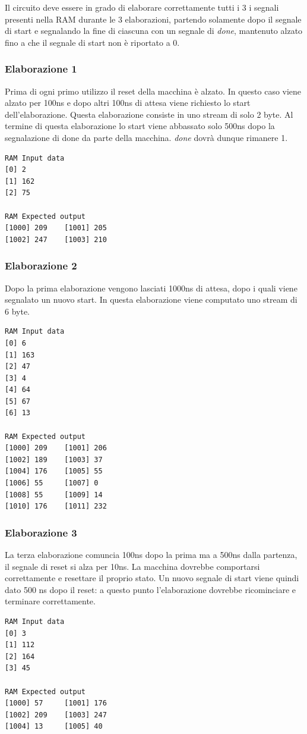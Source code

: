 \documentclass[a4paper]{report}
\begin{document}
Il circuito deve essere in grado di elaborare correttamente tutti i 3 i segnali presenti nella RAM durante le 3 elaborazioni, partendo solamente dopo il segnale di start e segnalando la fine di ciascuna con un segnale di \textit{done}, mantenuto alzato fino a che il segnale di start non è riportato a 0.

\subsubsection{Elaborazione 1}
Prima di ogni primo utilizzo il reset della macchina è alzato. In questo caso viene alzato per 100ns e dopo altri 100ns di attesa viene richiesto lo start dell'elaborazione. Questa elaborazione consiste in uno stream di solo 2 byte. Al termine di questa elaborazione lo start viene abbassato solo 500ns dopo la segnalazione di done da parte della macchina. \textit{done} dovrà dunque rimanere 1.
\begin{verbatim}
RAM Input data
[0] 2
[1] 162
[2] 75

RAM Expected output
[1000] 209    [1001] 205
[1002] 247    [1003] 210
\end{verbatim}

\subsubsection{Elaborazione 2}
Dopo la prima elaborazione vengono lasciati 1000ns di attesa, dopo i quali viene segnalato un nuovo start. In questa elaborazione viene computato uno stream di 6 byte.
\begin{verbatim}
RAM Input data
[0] 6
[1] 163
[2] 47
[3] 4
[4] 64
[5] 67
[6] 13
  
RAM Expected output
[1000] 209    [1001] 206
[1002] 189    [1003] 37
[1004] 176    [1005] 55
[1006] 55     [1007] 0
[1008] 55     [1009] 14
[1010] 176    [1011] 232
\end{verbatim}

\subsubsection{Elaborazione 3}
La terza elaborazione comuncia 100ns dopo la prima ma a 500ns dalla partenza, il segnale di reset si alza per 10ns. La macchina dovrebbe comportarsi correttamente e resettare il proprio stato. Un nuovo segnale di start viene quindi dato 500 ns dopo il reset: a questo punto l'elaborazione dovrebbe ricominciare e terminare correttamente.
\begin{verbatim}
RAM Input data
[0] 3
[1] 112
[2] 164
[3] 45
  
RAM Expected output
[1000] 57     [1001] 176
[1002] 209    [1003] 247
[1004] 13     [1005] 40
\end{verbatim}
\end{document}
